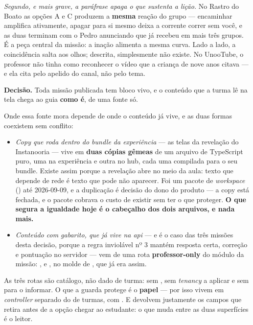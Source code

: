 \emph{Segundo, e mais grave, a paráfrase apaga o que sustenta a lição.} No
Rastro do Boato as opções A e C produzem a \textbf{mesma} reação do grupo ---
encaminhar amplifica ativamente, apagar para si mesmo deixa a corrente correr
sem você, e as duas terminam com o Pedro anunciando que já recebeu em mais três
grupos. É a peça central da missão: a inação alimenta a mesma curva. Lado a
lado, a coincidência salta aos olhos; descrita, simplesmente não existe. No
UnooTube, o professor não tinha como reconhecer o vídeo que a criança de nove
anos citava --- e ela cita pelo apelido do canal, não pelo tema.

\textbf{Decisão.} Toda missão publicada tem bloco vivo, e o conteúdo que a turma
lê na tela chega ao guia \textbf{como é}, de uma fonte só.

Onde essa fonte mora depende de onde o conteúdo já vive, e as duas formas
coexistem sem conflito:

\begin{itemize}
  \item \emph{Copy que roda dentro do bundle da experiência} --- as telas da
    revelação do Instanooria --- vive em \textbf{duas cópias gêmeas} de um
    arquivo de TypeScript puro, uma na experiência e outra no hub, cada uma
    compilada para o seu bundle. Existe assim porque a revelação abre no meio da
    aula: texto que depende de rede é texto que pode não aparecer. Foi um pacote
    de \emph{workspace} () até 2026-09-09, e a
    duplicação é decisão do dono do produto --- a copy está fechada, e o pacote
    cobrava o custo de existir sem ter o que proteger. \textbf{O que segura a
    igualdade hoje é o cabeçalho dos dois arquivos, e nada mais.}
  \item \emph{Conteúdo com gabarito, que já vive na api} --- e é o caso das três
    missões desta decisão, porque a regra inviolável nº 3 mantém resposta certa,
    correção e pontuação no servidor --- vem de uma rota \textbf{professor-only}
    do módulo da missão: ,
     e
    , no molde de
    , que já era assim.
\end{itemize}

As três rotas são catálogo, não dado de turma: sem , sem
\emph{tenancy} a aplicar e sem  para o 
informar. O que a guarda protege é o \textbf{papel} --- por isso vivem em
\emph{controller} separado do de turmas, com . E devolvem justamente os campos que  retira antes
de a opção chegar ao estudante: o que muda entre as duas superfícies é o leitor.

